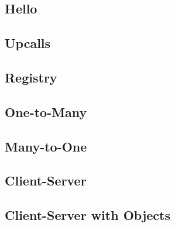 

\subsection{Hello}

\subsection{Upcalls}

\subsection{Registry}

\subsection{One-to-Many}

\subsection{Many-to-One}

\subsection{Client-Server}

\subsection{Client-Server with Objects}

